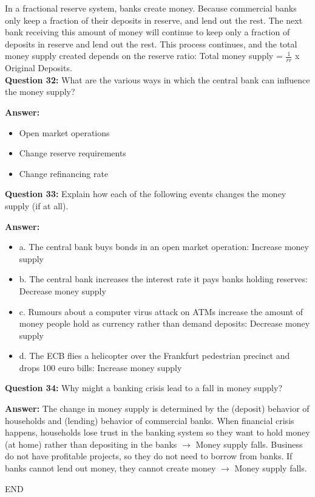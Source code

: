 \documentclass[a4paper, 11pt]{article}
\begin{document}
In a fractional reserve system, banks create money. Because commercial banks only keep a fraction of their deposits in reserve, and lend out the rest. The next bank receiving this amount of money will continue to keep only a fraction of deposits in reserve and lend out the rest. This process continues, and the total money supply created depends on the reserve ratio: Total money supply = $\frac{1}{rr}$ x Original Deposits. \\

\textbf{Question 32:} What are the various ways in which the central bank can influence the money supply?

\textbf{Answer:} 
\begin{itemize}
\item Open market operations
\item Change reserve requirements
\item Change refinancing rate
\end{itemize}

\textbf{Question 33:} Explain how each of the following events changes the money supply (if at all).

\textbf{Answer:} 

\begin{itemize}
\item a. The central bank buys bonds in an open market operation: Increase money supply
\item b. The central bank increases the interest rate it pays banks holding reserves: Decrease money supply
\item c. Rumours about a computer virus attack on ATMs increase the amount of money people hold as currency rather than demand deposits: Decrease money supply
\item d. The ECB flies a helicopter over the Frankfurt pedestrian precinct and drops 100 euro bills: Increase money supply
\end{itemize}

\textbf{Question 34:} Why might a banking crisis lead to a fall in money supply?

\textbf{Answer:} 
The change in money supply is determined by the (deposit) behavior of households and (lending) behavior of commercial banks. When financial crisis happens, households lose trust in the banking system so they want to hold money (at home) rather than depositing in the banks $\rightarrow$ Money supply falls. Business do not have profitable projects, so they do not need to borrow from banks. If banks cannot lend out money, they cannot create money $\rightarrow$ Money supply falls.

\centering
END
\end{document}
